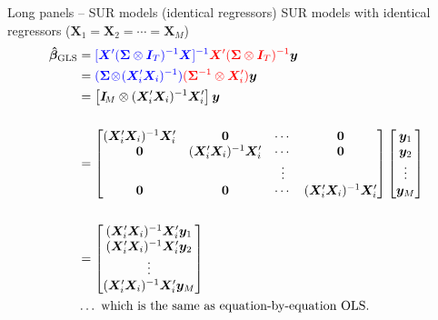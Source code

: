 \documentclass[usenames,dvipsnames]{beamer}
\begin{document}
\begin{frame}{Long panels -- SUR models (identical regressors)}
\small
SUR models with identical regressors ($\bm{X}_1=\bm{X}_2=\cdots=\bm{X}_M$)\\
\begin{align*}
    \bm{\hat{\beta}}_{\textnormal{GLS}} &= \textcolor{blue}{[\bm{X}^{\prime} (\bm{\Sigma} \otimes \bm{I}_T)^{-1} \bm{X}]^{-1}} \textcolor{red}{\bm{X}^{\prime} (\bm{\Sigma} \otimes \bm{I}_T)^{-1}} \bm{y} \\
    &= \textcolor{blue}{(\bm{\Sigma} \! \otimes \! (\bm{X}_i^{\prime}\bm{X}_i)^{-1})}\textcolor{red}{(\bm{\Sigma}^{-1} \otimes \bm{X}_i^{\prime})}\bm{y}\\
    &=\left[ \bm{I}_{\!M} \otimes (\bm{X}_i^{\prime}\bm{X}_i)^{-1}\bm{X}_i^{\prime}\right]\bm{y} \\ &~ \\
    &= \begin{bmatrix} 
    (\bm{X}_i^{\prime}\bm{X}_i)^{-1}\bm{X}_i^{\prime} & \bm{0} & \cdots & \bm{0} \\
    \bm{0} & (\bm{X}_i^{\prime}\bm{X}_i)^{-1}\bm{X}_i^{\prime} & \cdots & \bm{0} \\ 
      &   & \vdots &  \\ 
    \bm{0} & \bm{0} & \cdots & (\bm{X}_i^{\prime}\bm{X}_i)^{-1}\bm{X}_i^{\prime}\\ 
    \end{bmatrix}
    \begin{bmatrix}
    \bm{y}_1 \\ \bm{y}_2 \\ \vdots \\ \bm{y}_M \\ 
    \end{bmatrix}\\ &~ \\
    &= \begin{bmatrix}
    (\bm{X}_i^{\prime}\bm{X}_i)^{-1}\bm{X}_i^{\prime} \bm{y}_1 \\
    (\bm{X}_i^{\prime}\bm{X}_i)^{-1}\bm{X}_i^{\prime} \bm{y}_2 \\
  \vdots \\
    (\bm{X}_i^{\prime}\bm{X}_i)^{-1}\bm{X}_i^{\prime} \bm{y}_M
    \end{bmatrix}\\
    &\dots \textnormal{ which is the same as equation-by-equation OLS.}
\end{align*} 
\end{frame}
\end{document}
